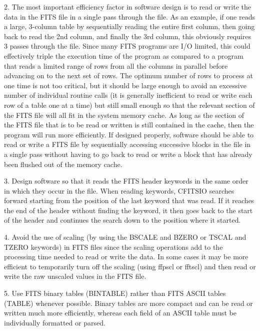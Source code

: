 2.  The most important efficiency factor in software design is to read
or write the data in the FITS file in a single pass through the file.
As an example, if one reads a large, 3-column table by sequentially
reading the entire first column, then going back to read the 2nd
column, and finally the 3rd column, this obviously requires 3 passes
through the file.  Since many FITS programs are I/O limited, this could
effectively triple the execution time of the program as compared to a
program that reads a limited range of rows from all the columns in
parallel before advancing on to the next set of rows.  The optimum
number of rows to process at one time is not too critical, but it
should be large enough to avoid an excessive number of individual
routine calls (it is generally inefficient to read or write each row of
a table one at a time) but still small enough so that the relevant
section of the FITS file will all fit in the system memory cache.   As
long as the section of the FITS file that is to be read or written is
still contained in the cache, then the program will run more
efficiently.  If designed properly, software should be able to read or
write a FITS file by sequentially accessing successive blocks in the
file in a single pass without having to go back to read or write a
block that has already been flushed out of the memory cache.

3. Design software so that it reads the FITS header keywords in the
same order in which they occur in the file.  When reading keywords,
CFITSIO searches forward starting from the position of the last keyword
that was read.  If it reaches the end of the header without finding the
keyword, it then goes back to the start of the header and continues the
search down to the position where it started.

4. Avoid the use of scaling (by using the BSCALE and BZERO or TSCAL and
TZERO keywords) in FITS files since the scaling operations add to the
processing time needed to read or write the data.  In some cases it may
be more efficient to temporarily turn off the scaling (using ffpscl or
fftscl) and then read or write the raw unscaled values in the FITS
file.

5. Use FITS binary tables (BINTABLE) rather than FITS ASCII tables
(TABLE) whenever possible. Binary tables are more compact and can be
read or written much more efficiently, whereas each field of an ASCII
table must be individually formatted or parsed.

